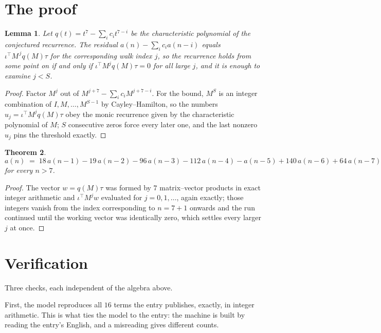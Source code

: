 \documentclass[11pt,a4paper]{article}
\theoremstyle{plain}
\newtheorem{theorem}{Theorem}
\newtheorem{lemma}[theorem]{Lemma}
\theoremstyle{definition}
\begin{document}
\section{The proof}

\begin{lemma}\label{lem:crit}
Let $q(t)=t^{7}-\sum_i c_it^{7-i}$ be the characteristic polynomial of the
conjectured recurrence. The residual $a(n)-\sum_ic_ia(n-i)$ equals
$\iota^{\!\top}M^{\,j}q(M)\tau$ for the corresponding walk index $j$, so the recurrence
holds from some point on if and only if $\iota^{\!\top}M^{j}q(M)\tau=0$ for all large $j$,
and it is enough to examine $j<S$.
\end{lemma}

\begin{proof}
Factor $M^{j}$ out of $M^{j+7}-\sum_ic_iM^{j+7-i}$. For the bound, $M^{S}$
is an integer combination of $I,M,\dots,M^{S-1}$ by Cayley--Hamilton, so the numbers
$u_j=\iota^{\!\top}M^{j}q(M)\tau$ obey the monic recurrence given by the characteristic
polynomial of $M$; $S$ consecutive zeros force every later one, and the last nonzero $u_j$
pins the threshold exactly.
\end{proof}

\begin{theorem}
\[
a(n)\;=\;18\,a(n-1) - 19\,a(n-2) - 96\,a(n-3) - 112\,a(n-4) - a(n-5) + 140\,a(n-6) + 64\,a(n-7)
\]
for every $n>7$.
\end{theorem}

\begin{proof}
The vector $w=q(M)\tau$ was formed by $7$ matrix--vector products in exact integer
arithmetic and $\iota^{\!\top}M^{j}w$ evaluated for $j=0,1,\dots$, again exactly; those
integers vanish from the index corresponding to $n=7+1$ onwards and the run continued
until the working vector was identically zero, which settles every larger $j$ at once.
\end{proof}

\section{Verification}

Three checks, each independent of the algebra above.

First, the model reproduces all $16$ terms the entry publishes, exactly, in integer
arithmetic. This is what ties the model to the entry: the machine is built by reading the
entry's English, and a misreading gives different counts.
\end{document}
